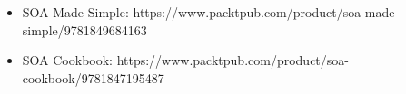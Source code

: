

\begin{itemize}
\item 
SOA Made Simple: https://www.packtpub.com/product/soa-made-simple/9781849684163

\item 
SOA Cookbook: https://www.packtpub.com/product/soa-cookbook/9781847195487
\end{itemize}